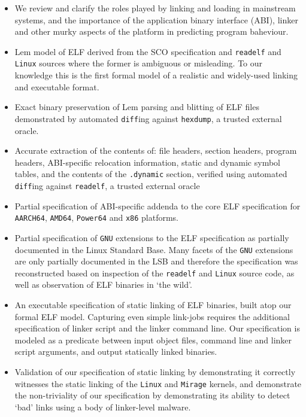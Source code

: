 \documentclass[preprint, natbib, 10pt]{sigplanconf-pldi15}
\begin{document}
\begin{itemize}
\item
We review and clarify the roles played by linking and loading in mainstream systems, and the importance of the application binary interface (ABI), linker and other murky aspects of the platform in predicting program baheviour.
\item
Lem model of ELF derived from the SCO specification and \texttt{readelf} and \texttt{Linux} sources where the former is ambiguous or misleading.
To our knowledge this is the first formal model of a realistic and widely-used linking and executable format.
\item
Exact binary preservation of Lem parsing and blitting of ELF files demonstrated by automated \texttt{diff}ing against \texttt{hexdump}, a trusted external oracle.
\item
Accurate extraction of the contents of: file headers, section headers, program headers, ABI-specific relocation information, static and dynamic symbol tables, and the contents of the \texttt{.dynamic} section, verified using automated \texttt{diff}ing against \texttt{readelf}, a trusted external oracle
\item
Partial specification of ABI-specific addenda to the core ELF specification for \texttt{AARCH64}, \texttt{AMD64}, \texttt{Power64} and \texttt{x86} platforms.
\item
Partial specification of \texttt{GNU} extensions to the ELF specification as partially documented in the Linux Standard Base.
Many facets of the \texttt{GNU} extensions are only partially documented in the LSB and therefore the specification was reconstructed based on inspection of the \texttt{readelf} and \texttt{Linux} source code, as well as observation of ELF binaries in `the wild'.
\item
An executable specification of static linking of ELF binaries, built atop our formal ELF model.
Capturing even simple link-jobs requires the additional specification of linker script and the linker command line.
Our specification is modeled as a predicate between input object files, command line and linker script arguments, and output statically linked binaries.
\item
Validation of our specification of static linking by demonstrating it correctly witnesses the static linking of the \texttt{Linux} and \texttt{Mirage} kernels, and demonstrate the non-triviality of our specification by demonstrating its ability to detect `bad' links using a body of linker-level malware.
\end{itemize}
\end{document}
